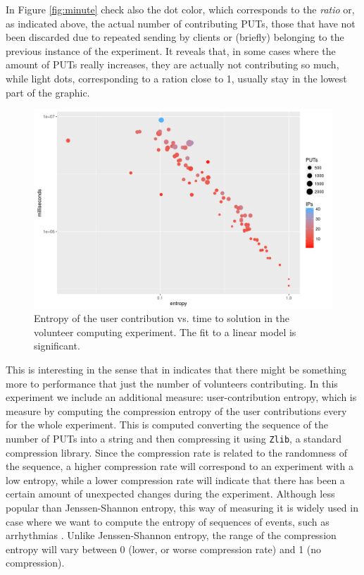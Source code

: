 \documentclass[runningheads,a4paper]{llncs}\usepackage[]{graphicx}\usepackage[]{color}
\makeatletter
\def\maxwidth{ %
  \ifdim\Gin@nat@width>\linewidth
    \linewidth
  \else
    \Gin@nat@width
  \fi
}
\newenvironment{knitrout}{}{} %
\makeatother
\begin{document}
In Figure \ref{fig:minute} check
also the dot color, which 
corresponds to the {\em ratio} or, as indicated above, the actual
number of contributing PUTs, those that have not been discarded due to
repeated sending by clients or (briefly) belonging to the previous
instance of the experiment. It reveals that, in some cases where the
amount of PUTs really increases, they are actually not contributing so
much, while light dots, corresponding to a ration close to 1, usually
stay in the lowest part of the graphic. 
%
\begin{figure}[ht!b]
\centering
\begin{knitrout}
\color{fgcolor}
\includegraphics[width=\maxwidth]{figure/entropy-1} 

\end{knitrout}
%
\caption{Entropy of the user contribution vs. time to solution in the
  volunteer computing experiment. The fit to a linear model is significant. \label{fig:entropy}}
\end{figure}

This is interesting in the sense that in indicates that there might be
something more to performance that just the number of volunteers
contributing. In this experiment we include an additional measure:
user-contribution entropy, which is measure by computing the
compression entropy of the user contributions every for the whole
experiment.  This is computed converting the sequence of the number of
PUTs into a string and then compressing it using {\tt Zlib}, a
standard compression library. Since the compression rate is related to
the randomness of the sequence, a higher compression rate will
correspond to an experiment with a low entropy, while a lower
compression rate will indicate that there has been a certain amount of
unexpected changes during the experiment. Although less popular than
Jenssen-Shannon entropy, this way of measuring it is widely used
\cite{ornstein1993entropy} in case where we want to compute the
entropy of sequences of events, such as arrhythmias
\cite{baumert2004forecasting}. Unlike Jenssen-Shannon entropy, the
range of the compression entropy will vary between 0 (lower, or worse
compression rate) and 1 (no compression). 
\end{document}
